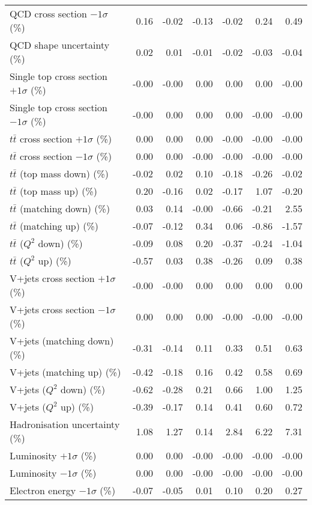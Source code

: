 \begin{table}[htbp]
{\begin{tabular}{lrrrrrr}
QCD cross section \ensuremath{-1\sigma} (\%) & 0.16 & -0.02 & -0.13 & -0.02 & 0.24 & 0.49 \\ 
QCD shape uncertainty (\%) & 0.02 & 0.01 & -0.01 & -0.02 & -0.03 & -0.04 \\ 
Single top cross section $+1\sigma$ (\%) & -0.00 & -0.00 & 0.00 & 0.00 & 0.00 & -0.00 \\ 
Single top cross section $-1\sigma$ (\%) & -0.00 & 0.00 & 0.00 & 0.00 & -0.00 & -0.00 \\ 
$t\bar{t}$ cross section $+1\sigma$ (\%) & 0.00 & 0.00 & 0.00 & -0.00 & -0.00 & -0.00 \\ 
$t\bar{t}$ cross section $-1\sigma$ (\%) & 0.00 & 0.00 & -0.00 & -0.00 & -0.00 & -0.00 \\ 
$t\bar{t}$ (top mass down) (\%) & -0.02 & 0.02 & 0.10 & -0.18 & -0.26 & -0.02 \\ 
$t\bar{t}$ (top mass up) (\%) & 0.20 & -0.16 & 0.02 & -0.17 & 1.07 & -0.20 \\ 
$t\bar{t}$ (matching down) (\%) & 0.03 & 0.14 & -0.00 & -0.66 & -0.21 & 2.55 \\ 
$t\bar{t}$ (matching up) (\%) & -0.07 & -0.12 & 0.34 & 0.06 & -0.86 & -1.57 \\ 
$t\bar{t}$ ($Q^{2}$ down) (\%) & -0.09 & 0.08 & 0.20 & -0.37 & -0.24 & -1.04 \\ 
$t\bar{t}$ ($Q^{2}$ up) (\%) & -0.57 & 0.03 & 0.38 & -0.26 & 0.09 & 0.38 \\ 
V+jets cross section \ensuremath{+1\sigma} (\%) & -0.00 & -0.00 & 0.00 & 0.00 & 0.00 & 0.00 \\ 
V+jets cross section \ensuremath{-1\sigma} (\%) & 0.00 & 0.00 & 0.00 & -0.00 & -0.00 & -0.00 \\ 
V+jets (matching down) (\%) & -0.31 & -0.14 & 0.11 & 0.33 & 0.51 & 0.63 \\ 
V+jets (matching up) (\%) & -0.42 & -0.18 & 0.16 & 0.42 & 0.58 & 0.69 \\ 
V+jets ($Q^{2}$ down) (\%) & -0.62 & -0.28 & 0.21 & 0.66 & 1.00 & 1.25 \\ 
V+jets ($Q^{2}$ up) (\%) & -0.39 & -0.17 & 0.14 & 0.41 & 0.60 & 0.72 \\ 
Hadronisation uncertainty (\%) & 1.08 & 1.27 & 0.14 & 2.84 & 6.22 & 7.31 \\ 
Luminosity $+1\sigma$ (\%) & 0.00 & 0.00 & -0.00 & -0.00 & -0.00 & -0.00 \\ 
Luminosity $-1\sigma$ (\%) & 0.00 & 0.00 & -0.00 & -0.00 & -0.00 & -0.00 \\ 
Electron energy $-1\sigma$ (\%) & -0.07 & -0.05 & 0.01 & 0.10 & 0.20 & 0.27 \\ 

\end{tabular}}
\end{table}
